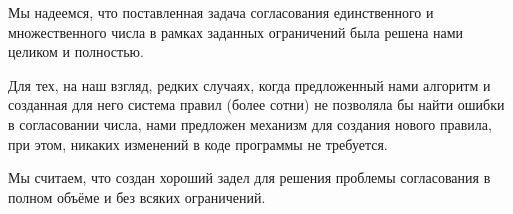\documentclass[main]{subfiles}
\begin{document}
Мы надеемся, что поставленная задача согласования единственного и множественного числа в рамках заданных ограничений была решена нами целиком и полностью. 

Для тех, на наш взгляд, редких случаях, когда предложенный нами алгоритм и созданная для него система правил (более сотни) не позволяла бы найти ошибки в согласовании числа, нами предложен механизм для создания нового правила, при этом, никаких изменений в коде программы не требуется.

Мы считаем, что создан хороший задел для решения проблемы согласования в полном объёме и без всяких ограничений.
\end{document}
